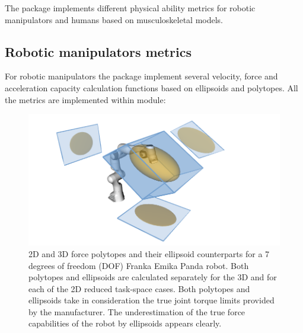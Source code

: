 The package implements different physical ability metrics for robotic manipulators and humans based on musculoskeletal models.

\subsection{Robotic manipulators metrics}
\label{sec:pycapacity_robot}

For robotic manipulators the package implement several velocity, force and acceleration capacity calculation functions based on ellipsoids and polytopes. All the metrics are implemented within  module:

\begin{figure}[!h]
    \centering
    \includegraphics[width=0.7\linewidth]{Papers/images/polytope_ellipsoid.png}
    \caption{2D and 3D force polytopes and their ellipsoid counterparts for a 7 degrees of freedom (DOF) Franka Emika Panda robot. Both polytopes and ellipsoids are calculated separately for the 3D and for each of the 2D reduced task-space cases. Both polytopes and ellipsoids take in consideration the true joint torque limits provided by the manufacturer. The underestimation of the true force capabilities of the robot by ellipsoids appears clearly.}
    \label{fig:force_polytope_robot_ellip_revisit}
\end{figure}



